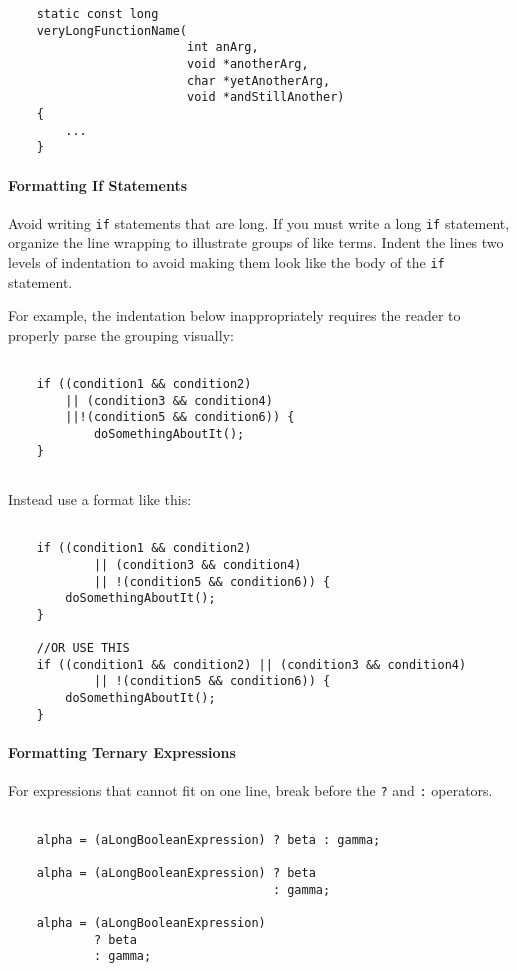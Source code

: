 \documentclass[fleqn,12pt]{PARCOneColumn} %
\begin{document}
\begin{lstlisting}
    static const long
    veryLongFunctionName(
                         int anArg,
                         void *anotherArg,
                         char *yetAnotherArg,
                         void *andStillAnother)
    {
    	...
	}
\end{lstlisting}


\paragraph{Formatting If Statements}
Avoid writing {\tt if} statements that are long.
If you must write a long {\tt if} statement, organize the line wrapping to illustrate groups of like terms.
Indent the lines two levels of indentation to avoid making them look like the body of the {\tt if} statement.

For example, the indentation below inappropriately requires the reader to properly parse the grouping visually:
\begin{lstlisting}[backgroundcolor=\color{badCodeColor}]

    if ((condition1 && condition2)
        || (condition3 && condition4)
        ||!(condition5 && condition6)) {
            doSomethingAboutIt();
    }
    
\end{lstlisting}

Instead use a format like this:
\begin{lstlisting}

    if ((condition1 && condition2)
            || (condition3 && condition4)
            || !(condition5 && condition6)) {
        doSomethingAboutIt();
    }

    //OR USE THIS
    if ((condition1 && condition2) || (condition3 && condition4)
            || !(condition5 && condition6)) {
        doSomethingAboutIt();
    }

\end{lstlisting}

\paragraph{Formatting Ternary Expressions}
For expressions that cannot fit on one line, break before the {\tt ?} and {\tt :} operators.
\begin{lstlisting}

    alpha = (aLongBooleanExpression) ? beta : gamma;  

    alpha = (aLongBooleanExpression) ? beta
                                     : gamma;  

    alpha = (aLongBooleanExpression)
            ? beta
            : gamma;  

\end{lstlisting}
\end{document}
